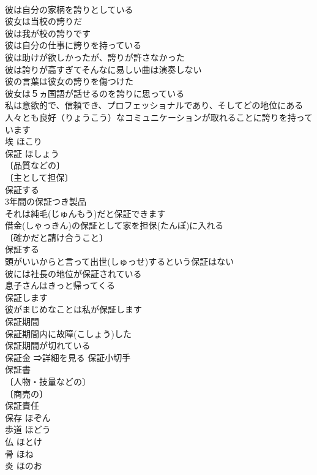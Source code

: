 \documentclass[8pt]{extreport}
\begin{document}
\begin{CJK}{UTF8}{min}
\\	彼は自分の家柄を誇りとしている 
\\	彼女は当校の誇りだ 
\\	彼は我が校の誇りです 
\\	彼は自分の仕事に誇りを持っている 
\\	彼は助けが欲しかったが、誇りが許さなかった 
\\	彼は誇りが高すぎてそんなに易しい曲は演奏しない 
\\	彼の言葉は彼女の誇りを傷つけた 
\\	彼女は５ヵ国語が話せるのを誇りに思っている 
\\	私は意欲的で、信頼でき、プロフェッショナルであり、そしてどの地位にある人々とも良好（りょうこう）なコミュニケーションが取れることに誇りを持っています 
\\	埃	ほこり	
\\	保証	ほしょう	
\\	〔品質などの〕
\\	〔主として担保〕
\\	保証する 
\\	3年間の保証つき製品 
\\	それは純毛(じゅんもう)だと保証できます 
\\	借金(しゃっきん)の保証として家を担保(たんぽ)に入れる 
\\	〔確かだと請け合うこと〕
\\	保証する 
\\	頭がいいからと言って出世(しゅっせ)するという保証はない 
\\	彼には社長の地位が保証されている 
\\	息子さんはきっと帰ってくる
\\	保証します 
\\	彼がまじめなことは私が保証します 
\\	保証期間 
\\	保証期間内に故障(こしょう)した 
\\	保証期間が切れている 
\\	保証金 ⇒詳細を見る 保証小切手 
\\	保証書 
\\	〔人物・技量などの〕
\\	〔商売の〕
\\	保証責任 
\\	保存	ほぞん	
\\	歩道	ほどう	
\\	仏	ほとけ	
\\	骨	ほね	
\\	炎	ほのお	

\end{CJK}
\end{document}
